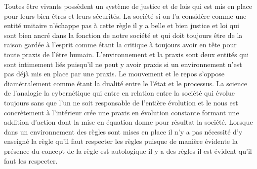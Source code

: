 \documentclass[12pt,letterpaper,oneside]{article}
\begin{document}
Toutes être vivants possèdent un système de justice et de lois qui est mis en place pour leurs bien êtres et leurs sécurités. La société si on l’a considère comme une entité unitaire n’échappe pas à cette règle il y a belle et bien justice et loi qui sont bien ancré dans la fonction de notre société et qui doit toujours être de la raison gardée à l’esprit comme étant la critique à toujours avoir en tête pour toute praxis de l’être humain. L’environnement et la praxis sont deux entités qui sont intimement liés puisqu’il ne peut y avoir praxis si un environnement n’est pas déjà mis en place par une praxis. Le mouvement et le repos s’oppose diamétralement comme étant la dualité entre le l’état et le processus. La science de l’analogie la cybernétique qui entre en relation entre la société qui évolue toujours sans que l’un ne soit responsable de l’entière évolution et le nous est concrètement à l’intérieur crée une praxis en évolution constante formant une addition d’action dont la mise en équation donne pour résultat la société. Lorsque dans un environnement des règles sont mises en place il n’y a pas nécessité d’y enseigné la règle qu’il faut respecter les règles puisque de manière évidente la présence du concept de la règle est autologique il y a des règles il est évident qu’il faut les respecter.
\end{document}
